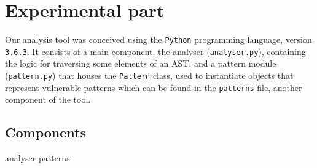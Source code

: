 \section*{Experimental part}
\label{sec:expr}

Our analysis tool was conceived using the \verb|Python| programming language,
version \verb|3.6.3|. It consists of a main component, the analyser
(\verb|analyser.py|), containing the logic for traversing some elements of an
AST, and a pattern module (\verb|pattern.py|) that houses the \verb|Pattern|
class, used to instantiate objects that represent vulnerable patterns which can
be found in the \verb|patterns| file, another component of the tool.

\subsection*{Components}

{analyser}
{patterns}
